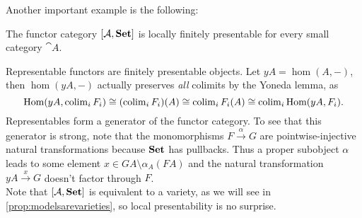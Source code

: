 Another important example is the following:
\begin{Example}\label{ex:representablepresentable}
The functor category $[\mathcal{A},\mathbf{Set}]$ is locally finitely presentable for every small category $\cat A$. 
\end{Example}
\begin{Proof}
Representable functors are finitely presentable objects. Let $yA = \hom(A,-)$, then $\hom(yA,-)$ actually preserves \emph{all} colimits by the Yoneda lemma, as 
\[ \textrm{Hom}(yA, \operatorname{colim}_i F_i) \cong (\operatorname{colim}_i F_i)(A) \cong \operatorname{colim}_i F_i(A) \cong \operatorname{colim}_i \textrm{Hom}(yA, F_i). \]
Representables form a generator of the functor category. To see that this generator is strong, note that the monomorphisms $F \xrightarrow{\alpha} G$ are pointwise-injective natural transformations because $\mathbf{Set}$ has pullbacks. Thus a proper subobject $\alpha$ leads to some element $x \in GA \setminus \alpha_A(FA)$ and the natural transformation $yA \xrightarrow{x} G$ doesn't factor through $F$. \\

Note that $[\mathcal{A},\mathbf{Set}]$ is equivalent to a variety, as we will see in \ref{prop:modelsarevarieties}, so local presentability is no surprise.
\end{Proof}

